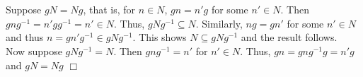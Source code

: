 \documentclass{article}
\begin{document}
\section{}
Suppose $gN = Ng$, that is, for $n \in N$, $gn = n'g$ for some $n' \in N$. Then $gng^{-1} = n'gg^{-1} = n' \in N$. Thus, $gNg^{-1} \subseteq N$. Similarly, $ng = gn'$ for some $n' \in N$ and thus $n = gn'g^{-1} \in gNg^{-1}$. This shows $N \subseteq gNg^{-1}$ and the result follows.\\
Now suppose $gNg^{-1} = N$. Then $gng^{-1} = n'$ for $n' \in N$. Thus, $gn = gng^{-1}g = n'g$ and $gN = Ng$ $\Box$
\end{document}
